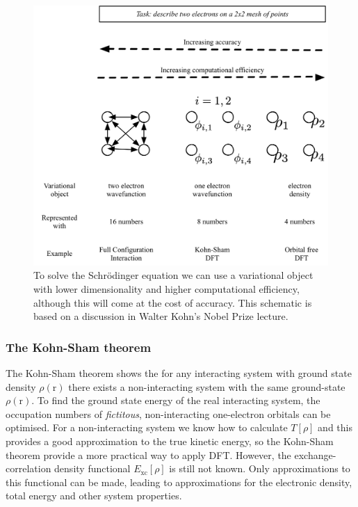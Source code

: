 \begin{figure}[h]
\centering
  \includegraphics[width=0.8\columnwidth]{figures/ch3/dimensions.png}
  \caption[Dimensionality of variational objects]{To solve the Schr\"{o}dinger equation we can use a variational object with lower dimensionality and higher computational efficiency, although this will come at the cost of accuracy. This schematic is based on a discussion in Walter Kohn's Nobel Prize lecture.\autocite{Kohn1999}}
  \label{dimensions}
\end{figure}


\subsubsection{The Kohn-Sham theorem} 

The Kohn-Sham theorem shows the for any interacting system with ground state density $\rho(\textrm{r})$ there exists a non-interacting system with the same ground-state $\rho(\textrm{r})$. To find the ground state energy of the real interacting system, the occupation numbers of \textit{fictitous}, non-interacting one-electron orbitals can be optimised. For a non-interacting system we know how to calculate $T\left[\rho\right]$ and this provides a good approximation to the true kinetic energy, so the Kohn-Sham theorem provide a more practical way to apply DFT. However, the exchange-correlation density functional $E_{\textrm{xc}}\left[\rho\right]$ is still not known. Only approximations to this functional can be made, leading to approximations for the electronic density, total energy and other system properties.


